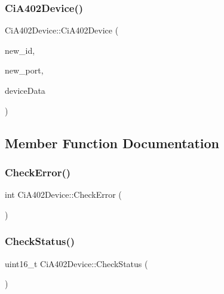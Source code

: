 \mbox{\label{classCiA402Device_af89b69466c797cc162a66f121c802b67}} 
\subsubsection{\texorpdfstring{Ci\+A402\+Device()}{CiA402Device()}\hspace{0.1cm}{\footnotesize\ttfamily [5/5]}}
{\footnotesize\ttfamily Ci\+A402\+Device\+::\+Ci\+A402\+Device (\begin{DoxyParamCaption}\item[{uint8\+\_\+t}]{new\+\_\+id,  }\item[{\hyperlink{classPortBase}{Port\+Base} $\ast$}]{new\+\_\+port,  }\item[{\hyperlink{classCiA402SetupData}{Ci\+A402\+Setup\+Data}}]{device\+Data }\end{DoxyParamCaption})}



\subsection{Member Function Documentation}
\mbox{\label{classCiA402Device_af1ed15805579e85e514e7ccf4ff21e10}} 
\subsubsection{\texorpdfstring{Check\+Error()}{CheckError()}}
{\footnotesize\ttfamily int Ci\+A402\+Device\+::\+Check\+Error (\begin{DoxyParamCaption}{ }\end{DoxyParamCaption})}

\mbox{\label{classCiA402Device_a5a034b00c87d2ec9ec98157b772465d9}} 
\subsubsection{\texorpdfstring{Check\+Status()}{CheckStatus()}}
{\footnotesize\ttfamily uint16\+\_\+t Ci\+A402\+Device\+::\+Check\+Status (\begin{DoxyParamCaption}{ }\end{DoxyParamCaption})}



